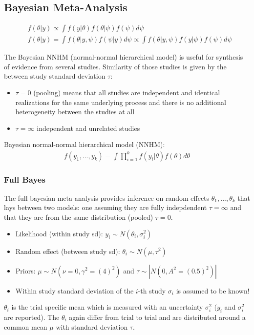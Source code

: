 \documentclass{article}\usepackage[]{graphicx}\usepackage[]{xcolor}
\begin{document}
\begin{multicols*}{2}
\section{Bayesian Meta-Analysis}
\begin{align*}
&\boxed{f(\theta|y)\propto \int f(y|\theta)f(\theta|\psi)f(\psi)d\psi}\\
&\boxed{f(\theta|y)=\int f(\theta|y,\psi)f(\psi|y)d\psi\propto \int f(\theta|y,\psi)f(y|\psi)f(\psi)d\psi}
\end{align*}

The Bayesian NNHM (normal-normal hierarchical model) is useful for synthesis of evidence from several studies. Similarity of those studies is given by the between study standard deviation $\tau$:
\begin{itemize}
\item $\tau=0$ (pooling) means that all studies are independent and identical realizations for the same underlying process and there is no additional heterogeneity between the studies at all
\item $\tau=\infty$ independent and unrelated studies
\end{itemize}

Bayesian normal-normal hierarchical model (NNHM):
\begin{align*}
\boxed{f(y_1,...,y_k)=\int \prod_{i=1}^{k}f(y_i|\theta)f(\theta)d\theta}
\end{align*}

\subsubsection{Full Bayes}
The full bayesian meta-analysis provides inference on random effects $\theta_1,...,\theta_k$ that lays between two models: one assuming they are fully indepdendent $\tau=\infty$ and that they are from the same distribution (pooled) $\tau=0$.

\begin{itemize}
\item Likelihood (within study sd): $y_i\sim N(\theta_i,\sigma_i^2)$
\item Random effect (between study sd): $\theta_i\sim N(\mu,\tau^2)$
\item Priors: $\mu\sim N(\nu=0, \gamma^2=(4)^2)$ and $\tau\sim |N(0,A^2=(0.5)^2)|$
\item Within study standard deviation of the $i$-th study $\sigma_i$ is assumed to be known!
\end{itemize}
$\theta_i$ is the trial specific mean which is measured with an uncertainty $\sigma_i^2$ ($y_i$ and $\sigma_i^2$ are reported). The $\theta_i$ again differ from trial to trial and are distributed around a common mean $\mu$ with standard deviation $\tau$.


\end{multicols*}
\end{document}
